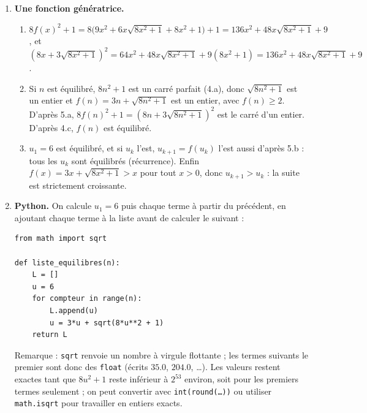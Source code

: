 \begin{enumerate}
\begin{enumerate}
    \item Le sens direct est la question 4.a. Réciproquement, si $8n^2 + 1 = e^2$ est un carré parfait, l'entier $b = \dfrac{e - (2n+1)}{2}$ est strictement positif d'après 4.b et vérifie $(2b + 2n + 1)^2 = e^2 = 8n^2 + 1$. En développant comme en 4.a, on obtient $4(b^2 + 2bn + b) + 4n^2 + 4n + 1 = 8n^2 + 1$, c'est-à-dire $n^2 - n = 2bn + b^2 + b$, soit $\dfrac{(n-1)n}{2} = \dfrac{b(2n+b+1)}{2}$ : $1 + 2 + \cdots + (n-1) = (n+1) + \cdots + (n+b)$, et $n$ est équilibré.
\end{enumerate}

\item \textbf{Une fonction génératrice.}
\begin{enumerate}
    \item $8f(x)^2 + 1 = 8\bigl(9x^2 + 6x\sqrt{8x^2+1} + 8x^2 + 1\bigr) + 1 = 136x^2 + 48x\sqrt{8x^2+1} + 9$, et
    $(8x + 3\sqrt{8x^2+1})^2 = 64x^2 + 48x\sqrt{8x^2+1} + 9(8x^2 + 1) = 136x^2 + 48x\sqrt{8x^2+1} + 9$.

    \item Si $n$ est équilibré, $8n^2 + 1$ est un carré parfait (4.a), donc $\sqrt{8n^2+1}$ est un entier et $f(n) = 3n + \sqrt{8n^2+1}$ est un entier, avec $f(n) \geqslant 2$. D'après 5.a, $8f(n)^2 + 1 = (8n + 3\sqrt{8n^2+1})^2$ est le carré d'un entier. D'après 4.c, $f(n)$ est équilibré.

    \item $u_1 = 6$ est équilibré, et si $u_k$ l'est, $u_{k+1} = f(u_k)$ l'est aussi d'après 5.b : tous les $u_k$ sont équilibrés (récurrence). Enfin $f(x) = 3x + \sqrt{8x^2+1} > x$ pour tout $x > 0$, donc $u_{k+1} > u_k$ : la suite est strictement croissante.
\end{enumerate}

\item \textbf{Python.} On calcule $u_1 = 6$ puis chaque terme à partir du précédent, en ajoutant chaque terme à la liste avant de calculer le suivant :
\begin{verbatim}
from math import sqrt

def liste_equilibres(n):
    L = []
    u = 6
    for compteur in range(n):
        L.append(u)
        u = 3*u + sqrt(8*u**2 + 1)
    return L
\end{verbatim}
Remarque : \texttt{sqrt} renvoie un nombre à virgule flottante ; les termes suivants le premier sont donc des \texttt{float} (écrits $35.0$, $204.0$, \dots). Les valeurs restent exactes tant que $8u^2 + 1$ reste inférieur à $2^{53}$ environ, soit pour les premiers termes seulement ; on peut convertir avec \texttt{int(round(\ldots))} ou utiliser \texttt{math.isqrt} pour travailler en entiers exacts.
\end{enumerate}
